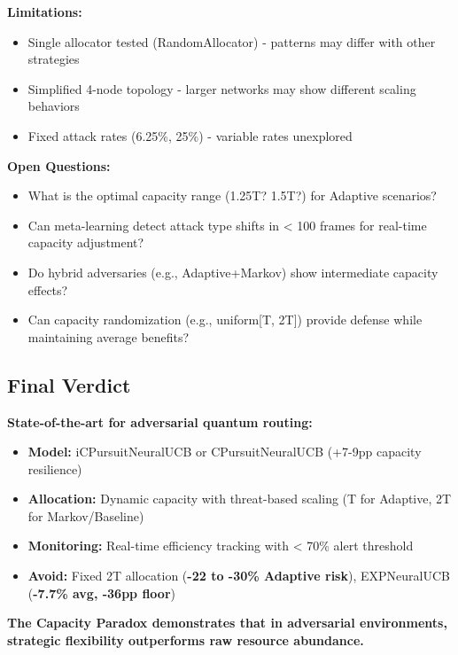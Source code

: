 \documentclass[11pt,a4paper]{article}
\newcommand{\critical}[1]{\textcolor{criticalcolor}{\textbf{#1}}}
\newcommand{\success}[1]{\textcolor{successcolor}{\textbf{#1}}}
\begin{document}
\textbf{Limitations:}
\begin{itemize}
    \vspace{-0.2cm}
    \item Single allocator tested (RandomAllocator) - patterns may differ with other strategies
    \vspace{-0.2cm}
    \item Simplified 4-node topology - larger networks may show different scaling behaviors
    \vspace{-0.2cm}
    \item Fixed attack rates (6.25\%, 25\%) - variable rates unexplored
\end{itemize}

\textbf{Open Questions:}
\begin{itemize}
    \vspace{-0.2cm}
    \item What is the optimal capacity range (1.25T? 1.5T?) for Adaptive scenarios?
    \vspace{-0.2cm}
    \item Can meta-learning detect attack type shifts in < 100 frames for real-time capacity adjustment?
    \vspace{-0.2cm}
    \item Do hybrid adversaries (e.g., Adaptive+Markov) show intermediate capacity effects?
    \vspace{-0.2cm}
    \item Can capacity randomization (e.g., uniform[T, 2T]) provide defense while maintaining average benefits?
\end{itemize}

\subsection{Final Verdict}

\textbf{State-of-the-art for adversarial quantum routing:}
\begin{itemize}
    \vspace{-0.2cm}
    \item \textbf{Model:} iCPursuitNeuralUCB or CPursuitNeuralUCB (+7-9pp capacity resilience)
    \vspace{-0.2cm}
    \item \textbf{Allocation:} Dynamic capacity with threat-based scaling (T for Adaptive, 2T for Markov/Baseline)
    \vspace{-0.2cm}
    \item \textbf{Monitoring:} Real-time efficiency tracking with < 70\% alert threshold
    \vspace{-0.2cm}
    \item \textbf{Avoid:} Fixed 2T allocation (\critical{-22 to -30\% Adaptive risk}), EXPNeuralUCB (\critical{-7.7\% avg, -36pp floor})
\end{itemize}

\vspace{0.3cm}
\begin{center}
\textbf{The Capacity Paradox demonstrates that in adversarial environments, \\
\success{strategic flexibility outperforms raw resource abundance.}}
\end{center}
\end{document}
